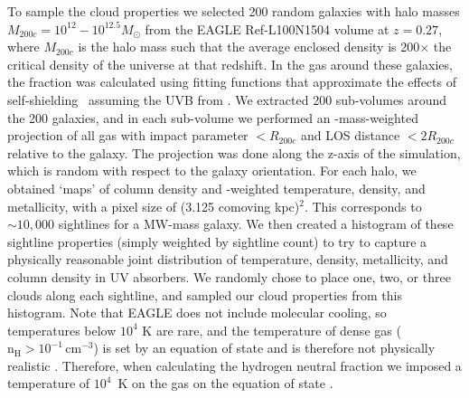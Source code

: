 \documentclass[fleqn,usenatbib]{mnras}
\begin{document}
To sample the cloud properties we selected 200 random galaxies with halo masses $M_{200c} = 10^{12} - 10^{12.5} M_\odot$ from the EAGLE Ref-L100N1504 volume at $z=0.27$, where $M_{200c}$ is the halo mass such that the average enclosed density is 200$\times$ the critical density of the universe at that redshift.
In the gas around these galaxies, the  fraction was calculated using fitting functions that approximate the effects of self-shielding~\citep{rahmati2013Impact} assuming the UVB from \citet{haardt2001Modelling}.
We extracted 200 sub-volumes around the 200 galaxies, and in each sub-volume we performed an -mass-weighted projection of all gas with impact parameter $< R_{200c}$ and LOS distance $< 2 R_{200c}$ relative to the galaxy. The projection was done along the z-axis of the simulation, which is random with respect to the galaxy orientation.
For each halo, we obtained  `maps' of  column density and -weighted temperature, density, and metallicity, with a pixel size of (3.125 comoving kpc)$^2$.
This corresponds to $\sim 10,000$ sightlines for a MW-mass galaxy.
We then created a histogram of these sightline properties (simply weighted by sightline count) to try to capture a physically reasonable joint distribution of temperature, density, metallicity, and  column density in UV absorbers.
We randomly chose to place one, two, or three clouds along each sightline, and sampled our cloud properties from this histogram.
Note that EAGLE does not include molecular cooling, so temperatures below $10^4$ K are rare, and the temperature of dense gas ($\mathrm{n}_{\mathrm{H}} > 10^{-1} \, \mathrm{cm}^{-3}$) is set by an equation of state and is therefore not physically realistic \citep{schaye2015EAGLE}.
Therefore, when calculating the hydrogen neutral fraction we imposed a temperature of $10^4$~K on the gas on the equation of state \citep[following e.g.,][]{Rahmati2016}.
\end{document}
